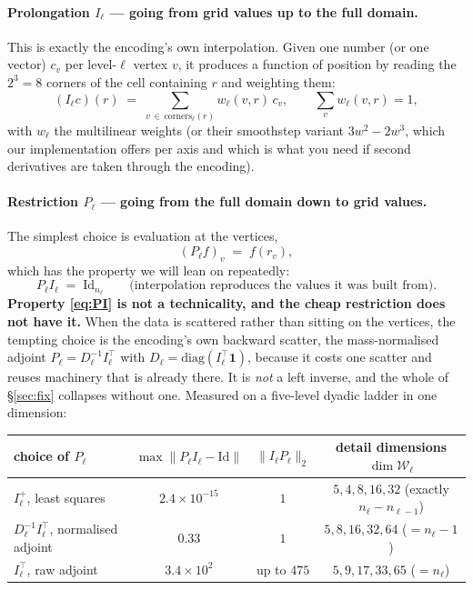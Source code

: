 \documentclass[11pt,a4paper]{article}
\newcommand{\Ws}{\mathcal{W}}
\newcommand{\Id}{\mathrm{Id}}
\begin{document}
\paragraph{Prolongation $I_\ell$ --- going from grid values up to the full domain.} This is
exactly the encoding's own interpolation. Given one number (or one vector) $c_v$ per
level-$\ell$ vertex $v$, it produces a function of position by reading the $2^3=8$ corners
of the cell containing $r$ and weighting them:
\begin{equation}
(I_\ell c)(r) \;=\; \sum_{v \,\in\, \mathrm{corners}_\ell(r)} w_\ell(v,r)\, c_v ,
\qquad
\sum_{v} w_\ell(v,r) = 1 ,
\label{eq:prolong}
\end{equation}
with $w_\ell$ the multilinear weights (or their smoothstep variant $3w^2-2w^3$, which our
implementation offers per axis and which is what you need if second derivatives are taken
through the encoding).

\paragraph{Restriction $P_\ell$ --- going from the full domain down to grid values.} The
simplest choice is evaluation at the vertices,
\begin{equation}
(P_\ell f)_v \;=\; f(r_v) ,
\label{eq:restrict}
\end{equation}
which has the property we will lean on repeatedly:
\begin{equation}
P_\ell I_\ell \;=\; \Id_{n_\ell}
\qquad\text{(interpolation reproduces the values it was built from).}
\label{eq:PI}
\end{equation}
\textbf{Property \eqref{eq:PI} is not a technicality, and the cheap restriction does not
have it.} When the data is scattered rather than sitting on the vertices, the tempting
choice is the encoding's own backward scatter, the mass-normalised adjoint
$P_\ell = D_\ell^{-1} I_\ell^{\!\top}$ with $D_\ell = \mathrm{diag}(I_\ell^{\!\top}\mathbf{1})$,
because it costs one scatter and reuses machinery that is already there. It is \emph{not} a
left inverse, and the whole of \S\ref{sec:fix} collapses without one. Measured on a
five-level dyadic ladder in one dimension:

\begin{center}
\begin{tabular}{@{}lccc@{}}
\toprule
\textbf{choice of $P_\ell$} & $\max\|P_\ell I_\ell - \Id\|$ & $\|I_\ell P_\ell\|_2$
  & \textbf{detail dimensions $\dim\Ws_\ell$} \\
\midrule
$I_\ell^{+}$, least squares      & $2.4\times10^{-15}$ & $1$ & $5,4,8,16,32$ \quad(exactly $n_\ell - n_{\ell-1}$) \\
$D_\ell^{-1}I_\ell^{\!\top}$, normalised adjoint & $0.33$ & $1$ & $5,8,16,32,64$ \quad($=n_\ell-1$) \\
$I_\ell^{\!\top}$, raw adjoint   & $3.4\times10^{2}$ & up to $475$ & $5,9,17,33,65$ \quad($=n_\ell$) \\
\bottomrule
\end{tabular}
\end{center}
\end{document}
